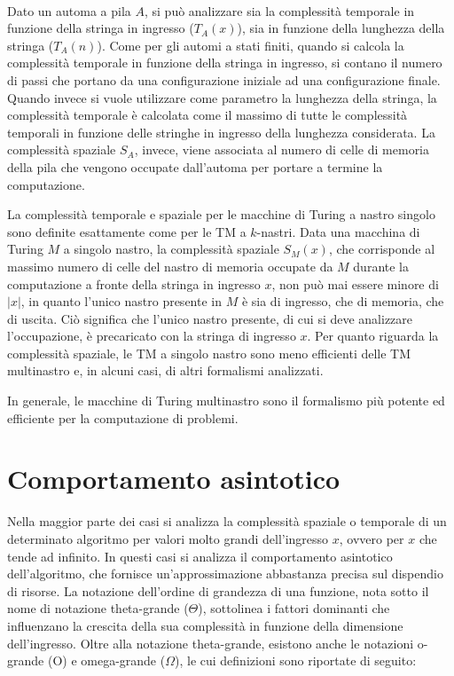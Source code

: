   \paragraph{}
  Dato un automa a pila \(A\), si può analizzare sia la complessità temporale in funzione della stringa in ingresso (\({T}_A(x)\)), sia in funzione della lunghezza della stringa (\({T}_A(n)\)). Come per gli automi a stati finiti, quando si calcola la complessità temporale in funzione della stringa in ingresso, si contano il numero di passi che portano da una configurazione iniziale ad una configurazione finale. Quando invece si vuole utilizzare come parametro la lunghezza della stringa, la complessità temporale è calcolata come il massimo di tutte le complessità temporali in funzione delle stringhe in ingresso della lunghezza considerata. La complessità spaziale \({S}_A\), invece, viene associata al numero di celle di memoria della pila che vengono occupate dall'automa per portare a termine la computazione.

  \vspace*{10px}

  La complessità temporale e spaziale per le macchine di Turing a nastro singolo sono definite esattamente come per le TM a \(k\)-nastri. Data una macchina di Turing \(M\) a singolo nastro, la complessità spaziale \({S}_M(x)\), che corrisponde al massimo numero di celle del nastro di memoria occupate da \(M\) durante la computazione a fronte della stringa in ingresso \(x\), non può mai essere minore di \(|x|\), in quanto l'unico nastro presente in \(M\) è sia di ingresso, che di memoria, che di uscita. Ciò significa che l'unico nastro presente, di cui si deve analizzare l'occupazione, è precaricato con la stringa di ingresso \(x\). Per quanto riguarda la complessità spaziale, le TM a singolo nastro sono meno efficienti delle TM multinastro e, in alcuni casi, di altri formalismi analizzati. 
  
  In generale, le macchine di Turing multinastro sono il formalismo più potente ed efficiente per la computazione di problemi.


  \section{Comportamento asintotico}
  Nella maggior parte dei casi si analizza la complessità spaziale o temporale di un determinato algoritmo per valori molto grandi dell'ingresso \(x\), ovvero per \(x\) che tende ad infinito. In questi casi si analizza il comportamento asintotico dell'algoritmo, che fornisce un'approssimazione abbastanza precisa sul dispendio di risorse. La notazione dell'ordine di grandezza di una funzione, nota sotto il nome di notazione theta-grande (\(\Theta \)), sottolinea i fattori dominanti che influenzano la crescita della sua complessità in funzione della dimensione dell'ingresso. Oltre alla notazione theta-grande, esistono anche le notazioni o-grande (O) e omega-grande (\(\Omega \)), le cui definizioni sono riportate di seguito:

